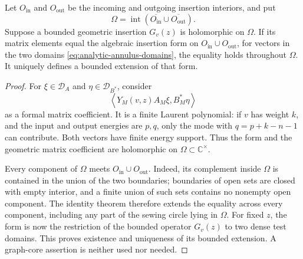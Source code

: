 \begin{lemma}
\label{lem:analytic-insertion-continuation}
Let $O_{\mathrm{in}}$ and $O_{\mathrm{out}}$ be the incoming and
outgoing insertion interiors, and put
\[
 \Omega=\operatorname{int}
  (\overline{O_{\mathrm{in}}}\cup\overline{O_{\mathrm{out}}}).
\]
Suppose a bounded geometric insertion $G_v(z)$ is holomorphic on
$\Omega$.  If its matrix elements equal the algebraic insertion form
on $O_{\mathrm{in}}\cup O_{\mathrm{out}}$, for vectors in the two
domains \eqref{eq:analytic-annulus-domains}, the equality holds
throughout $\Omega$.  It uniquely defines a bounded extension of that
form.
\end{lemma}
\begin{proof}
For $\xi\in\mathcal D_A$ and $\eta\in\mathcal D_{B^*}$, consider
\begin{equation}
 \left\langle Y_M(v,z)A_M\xi,B_M^*\eta\right\rangle
 \label{eq:analytic-laurent-pairing}
\end{equation}
as a formal matrix coefficient.  It is a finite Laurent polynomial:
if $v$ has weight $k$, and the input and output energies are $p,q$,
only the mode with $q=p+k-n-1$ can contribute.  Both vectors have
finite energy support.  Thus the form and the geometric matrix
coefficient are holomorphic on $\Omega\subset\mathbb C^\times$.

Every component of $\Omega$ meets
$O_{\mathrm{in}}\cup O_{\mathrm{out}}$.  Indeed, its complement
inside $\Omega$ is contained in the union of the two boundaries;
boundaries of open sets are closed with empty interior, and a finite
union of such sets contains no nonempty open component.  The identity
theorem therefore extends the equality across every component,
including any part of the sewing circle lying in $\Omega$.
For fixed $z$, the form is now the restriction of the bounded operator
$G_v(z)$ to two dense test domains.  This proves existence and
uniqueness of its bounded extension.  A graph-core assertion is neither
used nor needed.
\end{proof}

